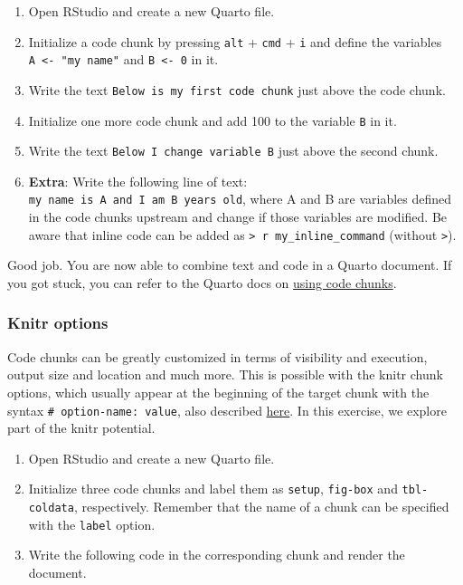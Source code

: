 \documentclass[
]{book}
\providecommand{\tightlist}{%
  \setlength{\itemsep}{0pt}\setlength{\parskip}{0pt}}
\begin{document}
\begin{enumerate}
\def\labelenumi{\arabic{enumi}.}
\tightlist
\item
  Open RStudio and create a new Quarto file.
\item
  Initialize a code chunk by pressing \texttt{alt} + \texttt{cmd} + \texttt{i} and define the variables
  \texttt{A\ \textless{}-\ "my\ name"} and \texttt{B\ \textless{}-\ 0} in it.
\item
  Write the text \texttt{Below\ is\ my\ first\ code\ chunk} just above the code chunk.
\item
  Initialize one more code chunk and add 100 to the variable \texttt{B} in it.
\item
  Write the text \texttt{Below\ I\ change\ variable\ B} just above the second chunk.
\item
  \textbf{Extra}: Write the following line of text: \texttt{my\ name\ is\ A\ and\ I\ am\ B\ years\ old},
  where A and B are variables defined in the code chunks upstream and change if
  those variables are modified. Be aware that inline code can be added as
  \texttt{\textgreater{}\ r\ my\_inline\_command} (without \texttt{\textgreater{}}).
\end{enumerate}

Good job. You are now able to combine text and code in a Quarto document. If you
got stuck, you can refer to the Quarto docs on
\href{https://quarto.org/docs/visual-editor/technical.html\#code-chunks}{using code chunks}.

\hypertarget{knitr-options}{%
\subsubsection{Knitr options}\label{knitr-options}}

Code chunks can be greatly customized in terms of visibility and execution,
output size and location and much more. This is possible with the knitr chunk
options, which usually appear at the beginning of the target chunk with the
syntax \texttt{\#\textbar{}\ option-name:\ value}, also described
\href{https://quarto.org/docs/computations/r.html\#chunk-options}{here}.
In this exercise, we explore part of the knitr potential.

\begin{enumerate}
\def\labelenumi{\arabic{enumi}.}
\tightlist
\item
  Open RStudio and create a new Quarto file.
\item
  Initialize three code chunks and label them as \texttt{setup}, \texttt{fig-box} and
  \texttt{tbl-coldata}, respectively. Remember that the name of a chunk can be
  specified with the \texttt{label} option.
\item
  Write the following code in the corresponding chunk and render the document.
\end{enumerate}
\end{document}
